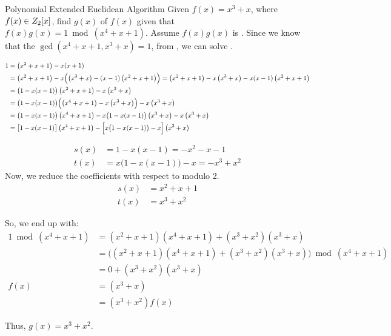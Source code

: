 \begin{example}[Lecture 3]{Polynomial Extended Euclidean Algorithm}
  Given $f(x) = x^{3} + x$, where $f(x) \in Z_{2}[x]$, find $g(x)$ of $f(x)$ given that $f(x) g(x) = 1 \bmod \left( x^{4} + x + 1 \right)$.
  Assume $f(x) g(x)$ is .
  \tcblower{}
  Since we know that the $\gcd \left( x^{4} + x + 1, x^{3} + x \right) = 1$, from , we can solve .

  \begin{align*}
    1 &= \left( x^{2} + x + 1 \right) - x (x+1) \\
      &= \left( x^{2} + x + 1 \right) - x \Bigl( \left( x^{3} + x \right) - (x-1) \left( x^{2} + x + 1 \right) \Bigr) = \left( x^{2} + x + 1 \right) - x \left( x^{3} + x \right) - x(x-1) \left( x^{2} + x + 1 \right) \\
      &= \bigl( 1 - x(x-1) \bigr) \left( x^{2} + x + 1 \right) - x \left( x^{3} + x \right) \\
      &= \bigl (1 - x(x-1) \bigr) \Bigl( \left( x^{4} + x + 1 \right) - x \left(x^{3} + x \right) \Bigr) - x \left( x^{3} +x  \right) \\
      &= \bigl( 1 - x(x-1) \bigr) \left( x^{4} + x + 1 \right) - x \bigl( 1 - x(x-1) \bigr) \left( x^{3} + x \right) - x \left( x^{3} + x \right) \\
    &= \bigl[ 1 - x(x-1) \bigr] \left( x^{4} + x + 1 \right) - \Bigl[ x \bigl( 1 - x(x-1) \bigr) - x \Bigr] \left( x^{3} + x \right)
  \end{align*}

  \begin{align*}
    s(x) &= 1 - x(x-1) = -x^{2} - x - 1 \\
    t(x) &= x \bigl( 1-x (x-1) \bigr) - x = -x^{3} + x^{2}
  \end{align*}
  Now, we reduce the coefficients with respect to modulo 2.
  \begin{align*}
    s(x) &= x^{2} + x + 1 \\
    t(x) &= x^{3} + x^{2}
  \end{align*}

  So, we end up with:
  \begin{align*}
    1 \bmod \left( x^{4} + x + 1 \right) &= \left( x^{2} + x + 1 \right) \left( x^{4} + x + 1 \right) + \left( x^{3} + x^{2} \right) \left( x^{3} + x \right) \\
                                        &= \biggl( \left( x^{2} + x + 1 \right) \left( x^{4} + x + 1 \right) + \left( x^{3} + x^{2} \right) \left( x^{3} + x \right) \biggr) \bmod \left( x^{4} + x + 1 \right) \\
                                        &= 0 + \left( x^{3} + x^{2} \right) \left( x^{3} + x \right) \\
    f(x) &= \left( x^{3} + x \right) \\
                                         &= \left( x^{3} + x^{2} \right) f(x)
  \end{align*}

  Thus, $g(x) = x^{3} + x^{2}$.
\end{example}

